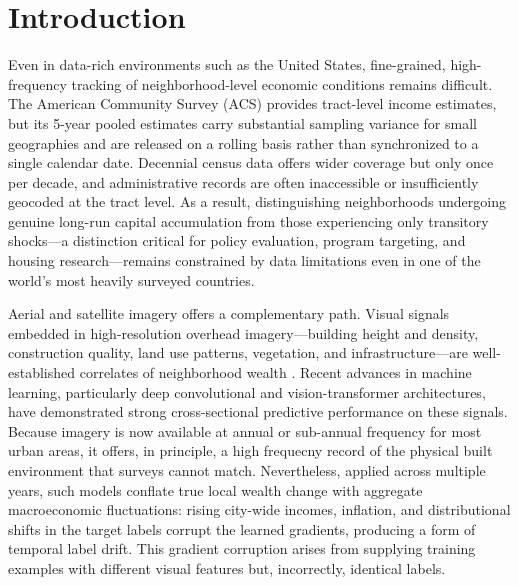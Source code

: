 \documentclass[conference]{IEEEtran}
\begin{document}
\section{Introduction}

Even in data-rich environments such as the United States, fine-grained, high-frequency tracking of neighborhood-level economic conditions remains difficult. The American Community Survey (ACS) provides tract-level income estimates, but its 5-year pooled estimates carry substantial sampling variance for small geographies and are released on a rolling basis rather than synchronized to a single calendar date. Decennial census data offers wider coverage but only once per decade, and administrative records are often inaccessible or insufficiently geocoded at the tract level. As a result, distinguishing neighborhoods undergoing genuine long-run capital accumulation from those experiencing only transitory shocks—a distinction critical for policy evaluation, program targeting, and housing research—remains constrained by data limitations even in one of the world's most heavily surveyed countries.

Aerial and satellite imagery offers a complementary path. Visual signals embedded in high-resolution overhead imagery—building height and density, construction quality, land use patterns, vegetation, and infrastructure—are well-established correlates of neighborhood wealth \citep{jean2016combining, yeh2020using, henderson2012measuring}. Recent advances in machine learning, particularly deep convolutional and vision-transformer architectures, have demonstrated strong cross-sectional predictive performance on these signals. Because imagery is now available at annual or sub-annual frequency for most urban areas, it offers, in principle, a high frequecny record of the physical built environment that surveys cannot match. Nevertheless, applied across multiple years, such models conflate true local wealth change with aggregate macroeconomic fluctuations: rising city-wide incomes, inflation, and distributional shifts in the target labels corrupt the learned gradients, producing a form of temporal label drift. This gradient corruption arises from supplying training examples with different visual features but, incorrectly, identical labels. 
\end{document}
